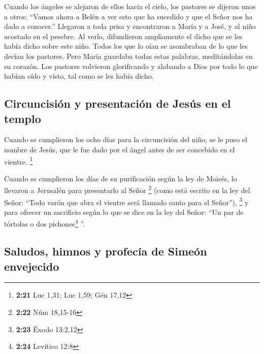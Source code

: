 \begin{paracol}{2}
 Cuando los ángeles se alejaron de ellos hacia el cielo,
los pastores se dijeron unos a otros: ``Vamos ahora a Belén a ver esto
que ha sucedido y que el Señor nos ha dado a conocer.'' 
Llegaron a toda prisa y encontraron a María y a José, y al niño acostado
en el pesebre.  Al verlo, difundieron ampliamente el
dicho que se les había dicho sobre este niño.  Todos los
que lo oían se asombraban de lo que les decían los pastores.
 Pero María guardaba todas estas palabras, meditándolas
en su corazón.  Los pastores volvieron glorificando y
alabando a Dios por todo lo que habían oído y visto, tal como se les
había dicho.

\hypertarget{circuncisiuxf3n-y-presentaciuxf3n-de-jesuxfas-en-el-templo}{%
\subsection{Circuncisión y presentación de Jesús en el
templo}\label{circuncisiuxf3n-y-presentaciuxf3n-de-jesuxfas-en-el-templo}}

 Cuando se cumplieron los ocho días para la circuncisión
del niño, se le puso el nombre de Jesús, que le fue dado por el ángel
antes de ser concebido en el vientre. \footnote{\textbf{2:21} Luc 1,31;
  Luc 1,59; Gén 17,12}

 Cuando se cumplieron los días de su purificación según
la ley de Moisés, lo llevaron a Jerusalén para presentarlo al Señor
\footnote{\textbf{2:22} Núm 18,15-16}  (como está escrito
en la ley del Señor: ``Todo varón que abra el vientre será llamado santo
para el Señor''), \footnote{\textbf{2:23} Éxodo 13:2,12} 
y para ofrecer un sacrificio según lo que se dice en la ley del Señor:
``Un par de tórtolas o dos pichones\footnote{\textbf{2:24} Levítico 12:8}
''.

\hypertarget{saludos-himnos-y-profecuxeda-de-simeuxf3n-envejecido}{%
\subsection{Saludos, himnos y profecía de Simeón
envejecido}\label{saludos-himnos-y-profecuxeda-de-simeuxf3n-envejecido}}


\end{paracol}
